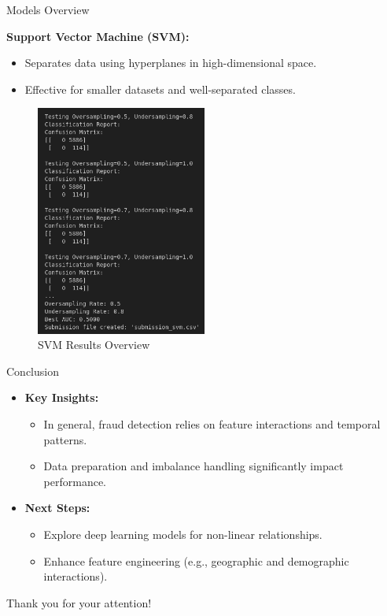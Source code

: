 \documentclass{beamer}
\begin{document}
\begin{frame}{Models Overview}
        \item \textbf{Support Vector Machine (SVM):}
        \begin{itemize}
            \item Separates data using hyperplanes in high-dimensional space.
            \item Effective for smaller datasets and well-separated classes.
        \end{itemize}
    \begin{figure}
        \centering
        \includegraphics[width=0.5\textwidth]{images/svm.png} %
        \caption{SVM Results Overview}
    \end{figure}
\end{frame}

\begin{frame}{Conclusion}
    \begin{itemize}
        \item \textbf{Key Insights:}
        \begin{itemize}
            \item In general, fraud detection relies on feature interactions and temporal patterns.
            \item Data preparation and imbalance handling significantly impact performance.
        \end{itemize}
        \item \textbf{Next Steps:}
        \begin{itemize}
            \item Explore deep learning models for non-linear relationships.
            \item Enhance feature engineering (e.g., geographic and demographic interactions).
        \end{itemize}
    \end{itemize}
\end{frame}


\begin{frame}{}
    \centering
    Thank you for your attention! \\
\end{frame}
\end{document}
